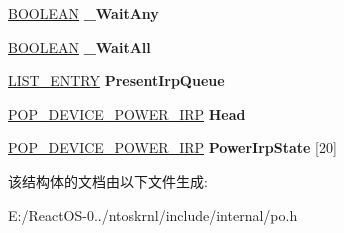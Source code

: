 \begin{DoxyCompactItemize}
\hyperlink{_processor_bind_8h_a112e3146cb38b6ee95e64d85842e380a}{B\+O\+O\+L\+E\+AN} {\bfseries \+\_\+\+Wait\+Any}
\item 
\mbox{\label{struct___p_o_p___d_e_v_i_c_e___s_y_s___s_t_a_t_e_a540c1ff054c345336717f1f9fad18c06}} 
\hyperlink{_processor_bind_8h_a112e3146cb38b6ee95e64d85842e380a}{B\+O\+O\+L\+E\+AN} {\bfseries \+\_\+\+Wait\+All}
\item 
\mbox{\label{struct___p_o_p___d_e_v_i_c_e___s_y_s___s_t_a_t_e_ad47f8433b554d52c4e87cb4feae01a58}} 
\hyperlink{struct___l_i_s_t___e_n_t_r_y}{L\+I\+S\+T\+\_\+\+E\+N\+T\+RY} {\bfseries Present\+Irp\+Queue}
\item 
\mbox{\label{struct___p_o_p___d_e_v_i_c_e___s_y_s___s_t_a_t_e_a4445ab3f5cd73a862b45ea8cea70783f}} 
\hyperlink{struct___p_o_p___d_e_v_i_c_e___p_o_w_e_r___i_r_p}{P\+O\+P\+\_\+\+D\+E\+V\+I\+C\+E\+\_\+\+P\+O\+W\+E\+R\+\_\+\+I\+RP} {\bfseries Head}
\item 
\mbox{\label{struct___p_o_p___d_e_v_i_c_e___s_y_s___s_t_a_t_e_a078636a8a3b19d98d64731445f8ec26e}} 
\hyperlink{struct___p_o_p___d_e_v_i_c_e___p_o_w_e_r___i_r_p}{P\+O\+P\+\_\+\+D\+E\+V\+I\+C\+E\+\_\+\+P\+O\+W\+E\+R\+\_\+\+I\+RP} {\bfseries Power\+Irp\+State} \mbox{[}20\mbox{]}
\end{DoxyCompactItemize}


该结构体的文档由以下文件生成\+:\begin{DoxyCompactItemize}
\item 
E\+:/\+React\+O\+S-\/0../ntoskrnl/include/internal/po.\+h\end{DoxyCompactItemize}
